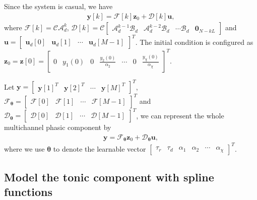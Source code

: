 \documentclass[10pt,conference]{ieeeconf}
\begin{document}
Since the system is casual, we have
\begin{align} \label{fml:the:out-dis}
\mathbf{y}[k] = \mathcal{F}[k] \mathbf{z}_0 + \mathcal{D}[k] \mathbf{u},
\end{align}
where $\mathcal{F}[k] = \mathcal{C}\mathcal{A}_d^k$, $\mathcal{D}[k] = \mathcal{C} \begin{bmatrix}
\mathcal{A}_d^{k-1} \mathcal{B}_d & \mathcal{A}_d^{k-2} \mathcal{B}_d & \cdots \mathcal{B}_d & \mathbf{0}_{N-kL}
\end{bmatrix}$ and \\$\mathbf{u} = \begin{bmatrix}
\mathbf{u}_d[0] & \mathbf{u}_d[1] & \cdots & \mathbf{u}_d[M-1]
\end{bmatrix}^T$. The initial condition is configured as \\$\mathbf{z}_{0} = \mathbf{z}[0] = \begin{bmatrix}
0 & y_1(0) & 0 & \frac{y_2(0)}{\alpha_2} & \cdots & 0 & \frac{y_{\chi}(0)}{\alpha_{\chi}}
\end{bmatrix}^T$.

Let $\mathbf{y} = \begin{bmatrix}
\mathbf{y}[1]^T & \mathbf{y}[2]^T & \cdots & \mathbf{y}[M]^T
\end{bmatrix}^T$, $\mathcal{F}_{\boldsymbol{\theta}} = \begin{bmatrix}
\mathcal{F}[0] & \mathcal{F}[1] & \cdots & \mathcal{F}[M-1]
\end{bmatrix}^T$ and \\$\mathcal{D}_{\boldsymbol{\theta}} = \begin{bmatrix}
\mathcal{D}[0] & \mathcal{D}[1] & \cdots & \mathcal{D}[M-1]
\end{bmatrix}^T$, we can represent the whole multichannel phasic component by
\begin{align} \label{fml:the:out-dis-all}
\mathbf{y} = \mathcal{F}_{\boldsymbol{\theta}} \mathbf{z}_{0} + \mathcal{D}_{\boldsymbol{\theta}} \mathbf{u},
\end{align}
where we use $\boldsymbol{\theta}$ to denote the learnable vector $\begin{bmatrix}
\tau_r & \tau_d & \alpha_1 & \alpha_2 & \cdots & \alpha_{\chi}
\end{bmatrix}^T$.

\subsection{Model the tonic component with spline functions}
\end{document}
